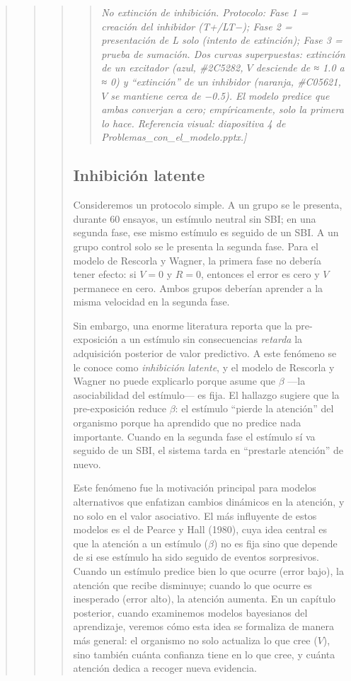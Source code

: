\documentclass[
  letterpaper,
  DIV=11,
  numbers=noendperiod]{scrreprt}
\begin{document}
\begin{tcolorbox}[enhanced jigsaw, arc=.35mm, bottomrule=.15mm, breakable, colback=white, colframe=quarto-callout-note-color-frame, left=2mm, leftrule=.75mm, opacityback=0, rightrule=.15mm, toprule=.15mm]
\begin{quote}
\begin{quote}
\begin{quote}
\begin{quote}
\emph{No extinción de inhibición. Protocolo: Fase 1 = creación del
inhibidor (T+/LT−); Fase 2 = presentación de L solo (intento de
extinción); Fase 3 = prueba de sumación. Dos curvas superpuestas:
extinción de un excitador (azul, \#2C5282, \(V\) desciende de ≈ 1.0 a ≈
0) y ``extinción'' de un inhibidor (naranja, \#C05621, \(V\) se mantiene
cerca de −0.5). El modelo predice que ambas converjan a cero;
empíricamente, solo la primera lo hace. Referencia visual: diapositiva 4
de Problemas\_con\_el\_modelo.pptx.{]}}
\end{quote}

\mbox{}%
\subsection{Inhibición latente}\label{inhibiciuxf3n-latente}

Consideremos un protocolo simple. A un grupo se le presenta, durante 60
ensayos, un estímulo neutral sin SBI; en una segunda fase, ese mismo
estímulo es seguido de un SBI. A un grupo control solo se le presenta la
segunda fase. Para el modelo de Rescorla y Wagner, la primera fase no
debería tener efecto: si \(V = 0\) y \(R = 0\), entonces el error es
cero y \(V\) permanece en cero. Ambos grupos deberían aprender a la
misma velocidad en la segunda fase.

Sin embargo, una enorme literatura reporta que la pre-exposición a un
estímulo sin consecuencias \emph{retarda} la adquisición posterior de
valor predictivo. A este fenómeno se le conoce como \emph{inhibición
latente}, y el modelo de Rescorla y Wagner no puede explicarlo porque
asume que \(\beta\) ---la asociabilidad del estímulo--- es fija. El
hallazgo sugiere que la pre-exposición reduce \(\beta\): el estímulo
``pierde la atención'' del organismo porque ha aprendido que no predice
nada importante. Cuando en la segunda fase el estímulo sí va seguido de
un SBI, el sistema tarda en ``prestarle atención'' de nuevo.

Este fenómeno fue la motivación principal para modelos alternativos que
enfatizan cambios dinámicos en la atención, y no solo en el valor
asociativo. El más influyente de estos modelos es el de Pearce y Hall
(1980), cuya idea central es que la atención a un estímulo (\(\beta\))
no es fija sino que depende de si ese estímulo ha sido seguido de
eventos sorpresivos. Cuando un estímulo predice bien lo que ocurre
(error bajo), la atención que recibe disminuye; cuando lo que ocurre es
inesperado (error alto), la atención aumenta. En un capítulo posterior,
cuando examinemos modelos bayesianos del aprendizaje, veremos cómo esta
idea se formaliza de manera más general: el organismo no solo actualiza
lo que cree (\(V\)), sino también cuánta confianza tiene en lo que cree,
y cuánta atención dedica a recoger nueva evidencia.


\end{quote}
\end{quote}
\end{quote}
\end{tcolorbox}
\end{document}
